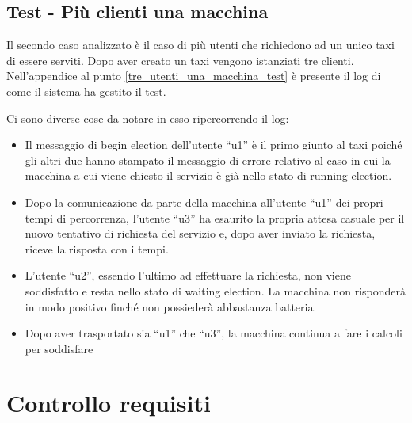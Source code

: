 \subsection{Test - Più clienti una macchina}
Il secondo caso analizzato è il caso di più utenti che richiedono ad un unico taxi di essere serviti. Dopo aver creato un taxi vengono istanziati tre clienti. Nell'appendice al punto \ref{tre_utenti_una_macchina_test} è presente il log di come il sistema ha gestito il test. 

Ci sono diverse cose da notare in esso ripercorrendo il log:
\begin{itemize}
	\item Il messaggio di begin election dell'utente ``u1'' è il primo giunto al taxi poiché gli altri due hanno stampato il messaggio di errore relativo al caso in cui la macchina a cui viene chiesto il servizio è già nello stato di running election.
	\item Dopo la comunicazione da parte della macchina all'utente ``u1'' dei propri tempi di percorrenza, l'utente ``u3'' ha esaurito la propria attesa casuale per il nuovo tentativo di richiesta del servizio e, dopo aver inviato la richiesta, riceve la risposta con i tempi. 
	\item L'utente ``u2'', essendo l'ultimo ad effettuare la richiesta, non viene soddisfatto e resta nello stato di waiting election. La macchina non risponderà in modo positivo finché non possiederà abbastanza batteria.
	\item Dopo aver trasportato sia ``u1'' che ``u3'', la macchina continua a fare i calcoli per soddisfare 
\end{itemize}




\section{Controllo requisiti}